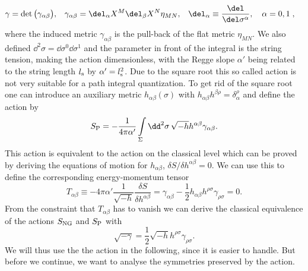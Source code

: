%
%
\begin{align}
\gamma &= \det \big(\gamma_{\alpha\beta}\big), & \gamma_{\alpha\beta} &= \del_{\alpha}X^{M}\del_{\beta}X^{N}\eta_{MN}, & \del_{\alpha}&\equiv \frac{\del}{\del\sigma^{\alpha}},\quad \alpha=0,1\;,
\end{align}
%
%
where the induced metric $\gamma_{\alpha\beta}$ is the pull-back of the flat  metric $\eta_{MN}$. We also defined $\dd^{2}\sigma = \dd\sigma^{0}\dd\sigma^{1}$ and the parameter in front of the integral is the string tension, making the action dimensionless, with the Regge slope $\alpha'$ being related to the string length $l_{\rm s}$ by $\alpha'=l_{\rm s}^{2}$. Due to the square root this so called  action is not very suitable for a path integral quantization. To get rid of the square root one can introduce an auxiliary metric $h_{\alpha\beta}(\sigma)$ with $h_{\alpha\beta}h^{\beta\rho}=\delta_{\alpha}^{\rho}$ and define the  action by
%
%
\begin{equation}
S_{\rm P} = -\frac{1}{4\pi\alpha'} \int\limits_{\Sigma}\dd^{2}\sigma\, \sqrt{-h}h^{\alpha\beta}\gamma_{\alpha\beta}.
\end{equation}
%
%
This action is equivalent to the  action on the classical level which can be proved by deriving the equations of motion for $h_{\alpha\beta}$, $\delta S/ \delta h^{\alpha\beta} = 0$. We can use this to define the corresponding energy-momentum tensor
%
%
\begin{equation}
T_{\alpha\beta} \equiv -4\pi\alpha' \frac{1}{\sqrt{-h}} \frac{\delta S}{\delta h^{\alpha\beta}} = \gamma_{\alpha\beta} - \frac{1}{2} h_{\alpha\beta} h^{\rho\sigma}\gamma_{\rho\sigma} = 0.
\end{equation}
%
%
From the constraint that $T_{\alpha\beta}$ has to vanish we can derive the classical equivalence of the actions $S_{\rm NG}$ and $S_{\rm P}$ with
%
%
\begin{equation}
\sqrt{-\gamma} = \frac{1}{2} \sqrt{-h} h^{\rho\sigma} \gamma_{\rho\sigma}.
\end{equation}
%
%
We will thus use the the  action in the following, since it is easier to handle. But before we continue, we want to analyse the symmetries preserved by the  action.
%
%
